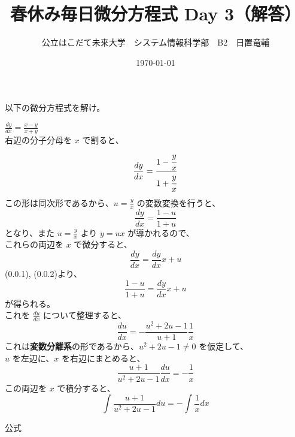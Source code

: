 \documentclass[dvipdfmx,uplatex]{jsarticle}
\title{春休み毎日微分方程式 Day 3（解答）}
\author{公立はこだて未来大学　システム情報科学部　B2　日置竜輔}
\date{\today}
\begin{document}
\begin{spacing}{1.6}
\maketitle

以下の微分方程式を解け。
\begin{qparts}
    \qpart $ \displaystyle \frac{dy}{dx} = \frac{x - y}{x + y} $ \\

    右辺の分子分母を $ x $ で割ると、\\
    \begin{equation}
      \frac{dy}{dx} = \frac{1 - \cfrac{y}{x}}{1 + \cfrac{y}{x}} \nonumber
    \end{equation}
    この形は同次形であるから、$ \displaystyle u = \frac{y}{x} $ の変数変換を行うと、
    \begin{equation}
      \frac{dy}{dx} = \frac{1 - u}{1 + u}
    \end{equation}
    となり、また $ \displaystyle u = \frac{y}{x} $ より $ y = ux $ が導かれるので、\\
    これらの両辺を $ x $ で微分すると、\\
    \begin{equation}
      \frac{dy}{dx} = \frac{dy}{dx}x + u
    \end{equation}
    (0.0.1), (0.0.2)より、
    \begin{equation}
      \frac{1 - u}{1 + u} = \frac{dy}{dx}x + u \nonumber
    \end{equation}
    が得られる。\\
    これを $ \displaystyle \frac{du}{dx} $ について整理すると、\\
    \begin{equation}
      \frac{du}{dx} = - \frac{u ^ 2 + 2u - 1}{u + 1}\frac{1}{x} \nonumber
    \end{equation}
    これは{\bf 変数分離系}の形であるから、$ u ^ 2 + 2u - 1 \neq 0 $ を仮定して、\\
    $ u $ を左辺に、$ x $ を右辺にまとめると、
    \begin{equation}
      \frac{u + 1}{u ^ 2 + 2u - 1} \frac{du}{dx} = -\frac{1}{x} \nonumber
    \end{equation}
    この両辺を $ x $ で積分すると、
    \begin{equation}
      \int \frac{u + 1}{u ^ 2 + 2u - 1} du = - \int \frac{1}{x}dx
    \end{equation}
    \begin{itembox}{公式}

\end{itembox}
\end{qparts}
\end{spacing}
\end{document}

